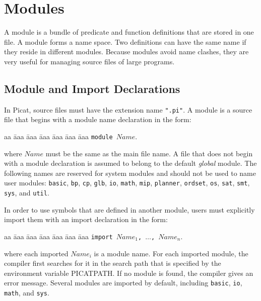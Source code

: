 \chapter{Modules}
A module is a bundle of predicate and function definitions that are stored in one file. A module forms a name space.  Two definitions can have the same name if they reside in different modules. Because modules avoid name clashes, they are very useful for managing source files of large programs.

\section{Module and Import Declarations}
In Picat, source files must have the extension name \texttt{".pi"}.  A module is a source file that begins with a module name declaration in the form:
\begin{tabbing}
aa \= aaa \= aaa \= aaa \= aaa \= aaa \= aaa \kill
\> \texttt{module $Name$}.
\end{tabbing}
where $Name$ must be the same as the main file name. A file that does not begin with a module declaration is assumed to belong to the default \emph{global} module. The following names are reserved for system modules and should not be used to name user modules: \texttt{basic}, \texttt{bp}, \texttt{cp}, \texttt{glb},  \texttt{io}, \texttt{math}, \texttt{mip}, \texttt{planner}, \texttt{ordset}, \texttt{os}, \texttt{sat}, \texttt{smt}, \texttt{sys},  and \texttt{util}.

In order to use symbols that are defined in another module, users must explicitly import them with an import declaration in the form:
\begin{tabbing}
aa \= aaa \= aaa \= aaa \= aaa \= aaa \= aaa \kill
\> \texttt{import $Name_1$, $\ldots$, $Name_n$}.
\end{tabbing}
where each imported $Name_i$ is a module name. For each imported module, the compiler first searches for it in the search path that is specified by the environment variable PICATPATH. If no module is found, the compiler gives an error message. Several modules are imported by default, including  \texttt{basic}, \texttt{io}, \texttt{math},  and \texttt{sys}.

